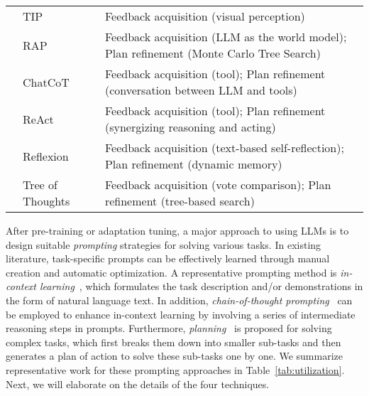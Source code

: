 \begin{table*}[t]
{\begin{tabular}{l|l|l}
                                     & TIP~\cite{Lu-2023-arXiv-multimodal}                  & Feedback acquisition (visual perception) \\
                                     & RAP~\cite{Hao-2023-arXiv-reasoning}                  & Feedback acquisition (LLM as the world model); Plan refinement (Monte Carlo Tree Search) \\
                                     & ChatCoT~\cite{Chen-2023-arXiv-chatcot}               & Feedback acquisition (tool); Plan refinement (conversation between LLM and tools) \\
                                     & ReAct~\cite{Yao-2022-arXiv-react}                    & Feedback acquisition (tool); Plan refinement (synergizing reasoning and acting)                                       \\
                                     & Reflexion~\cite{Shinn-2023-arXiv-Reflexion}          & Feedback acquisition (text-based self-reflection); Plan refinement (dynamic memory)                   \\
                                     & Tree of Thoughts~\cite{Yao-arxiv-2023-Tree}          & Feedback acquisition (vote comparison); Plan refinement (tree-based search)                                                       \\
\bottomrule
\end{tabular}%
}
\end{table*}

After pre-training or adaptation tuning, 
a major approach to using LLMs is to design suitable \textit{prompting} strategies for solving various tasks. {In existing literature, task-specific prompts can be effectively learned through manual creation and automatic optimization.} 
{A representative prompting method is \textit{in-context learning}~\cite{Brown-NeurIPS-2020-Language, Dong-arxiv-2023-A}, which formulates the task description and/or demonstrations in the form of natural language text.}
In addition, \textit{chain-of-thought prompting}~\cite{Wei-arxiv-2022-chain} can be employed to enhance in-context learning by involving a series of intermediate reasoning steps in prompts.
Furthermore, \textit{planning}~\cite{Zhou-arxiv-2022-Least} is proposed for solving complex tasks, which first breaks them down into smaller sub-tasks and then generates a plan of action to solve these sub-tasks one by one.
We summarize representative work for these prompting approaches in Table~\ref{tab:utilization}.
Next, we will elaborate on the details of the four techniques.







